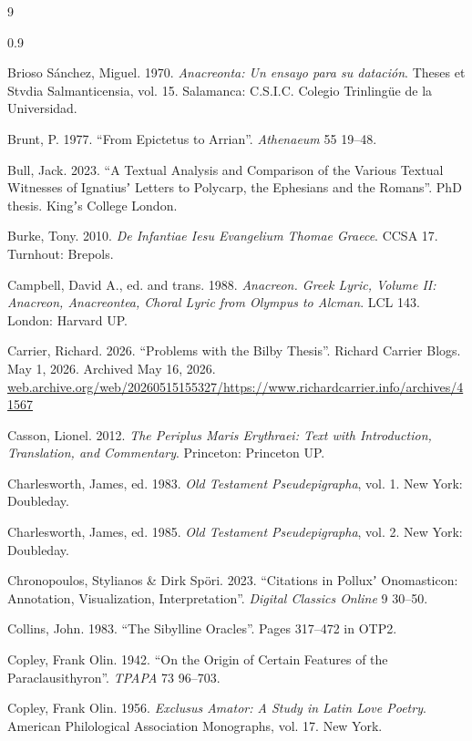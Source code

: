 \begin{thebibliography}{9}
\begin{spacing}{0.9}
\begin{small}
Brioso Sánchez, Miguel. 1970. %
\textit{Anacreonta: Un ensayo para su datación}. %
Theses et Stvdia Salmanticensia, vol. 15. %
Salamanca: C.S.I.C. Colegio Trinlingüe de la Universidad. %

Brunt, P. 1977. %
“From Epictetus to Arrian”. %
\textit{Athenaeum} 55 19--48. %

Bull, Jack. 2023. %
“A Textual Analysis and Comparison of the Various Textual Witnesses of %
Ignatiusʼ Letters to Polycarp, the Ephesians and the Romans”. %
PhD thesis. Kingʼs College London. %

Burke, Tony. 2010. %
\textit{De Infantiae Iesu Evangelium Thomae Graece}. %
CCSA 17. Turnhout: Brepols. 

Campbell, David A., ed. and trans. 1988. %
\textit{Anacreon. Greek Lyric, Volume II: Anacreon, Anacreontea, Choral Lyric from Olympus to Alcman}. %
LCL 143. London: Harvard UP. %

Carrier, Richard. 2026. %
“Problems with the Bilby Thesis”. %
Richard Carrier Blogs. %
May 1, 2026. Archived May 16, 2026. %
\url{web.archive.org/web/20260515155327/https://www.richardcarrier.info/archives/41567}

Casson, Lionel. 2012. %
\textit{The Periplus Maris Erythraei: Text with Introduction, Translation, and Commentary}. %
Princeton: Princeton UP. %

Charlesworth, James, ed. 1983. %
\textit{Old Testament Pseudepigrapha}, vol. 1. %
New York: Doubleday. %

Charlesworth, James, ed. 1985. %
\textit{Old Testament Pseudepigrapha}, vol. 2. %
New York: Doubleday. %

Chronopoulos, Stylianos \& Dirk Spöri. 2023. %
“Citations in Polluxʼ Onomasticon: Annotation, Visualization, Interpretation”. %
\textit{Digital Classics Online} 9 30--50. 

Collins, John. 1983. %
“The Sibylline Oracles”. %
Pages 317--472 in OTP2. %

Copley, Frank Olin. 1942. %
“On the Origin of Certain Features of the Paraclausithyron”. %
\textit{TPAPA} 73 96--703. %

Copley, Frank Olin. 1956. %
\textit{Exclusus Amator: A Study in Latin Love Poetry}. %
American Philological Association Monographs, vol. 17. %
New York. %


\end{small}
\end{spacing}
\end{thebibliography}
